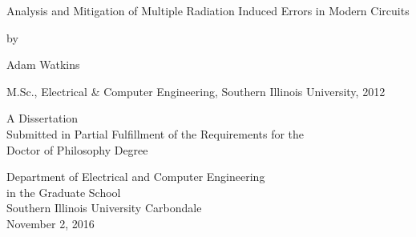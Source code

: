 \begin{center}


Analysis and Mitigation of Multiple Radiation Induced Errors in Modern Circuits

\vskip 1.8in

by

Adam Watkins

M.Sc., Electrical \& Computer Engineering, Southern Illinois University, 2012

\vskip 2in

\vbox{\baselineskip=14pt
A Dissertation \\
Submitted in Partial Fulfillment of the Requirements for the \\
Doctor of Philosophy Degree
}

\vskip 2in


\vbox{\baselineskip=14pt
Department of Electrical and Computer Engineering \\
in the Graduate School \\
Southern Illinois University Carbondale \\
November 2, 2016
}

\end{center}
